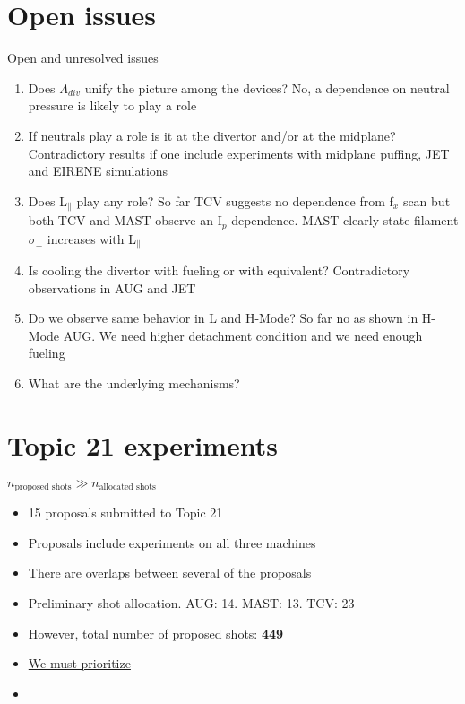 \documentclass[10pt, compress, draft]{beamer}
\begin{document}
  \section{Open issues}
  \begin{frame}{Open and unresolved issues}
  \begin{enumerate}[<+(1) | invisible@-+>]
    \item Does $\Lambda_{div}$ unify the picture among the devices?
      \alert{No, a dependence on neutral pressure is likely to play a role}
    \item If neutrals play a role is it at the divertor and/or at the midplane?
      \alert{Contradictory results if one include experiments with
        midplane puffing, JET and EIRENE simulations}
    \item Does L$_\parallel$ play any role? \alert{So far TCV suggests no
      dependence from f$_x$ scan but both TCV and MAST observe an
      I$_p$ dependence. MAST clearly state filament $\sigma_{\perp}$
      increases with L$_{\parallel}$ }
    \item Is cooling the divertor with fueling or with equivalent? \alert{Contradictory observations in AUG and JET}
    \item Do we observe same behavior in L and H-Mode? \alert{So
      far no as shown in H-Mode AUG. We need higher detachment
      condition and we need enough fueling}
      \item What are the underlying mechanisms? 
    \end{enumerate}
  \end{frame}
  
\section{Topic 21 experiments }
\begin{frame}{$n_{\text{proposed shots}} \gg n_{\text{allocated shots}}$}
	\begin{itemize}
		\item 15 proposals submitted to Topic 21
		\item Proposals include experiments on all three machines 
		\item There are overlaps between several of the proposals 
		\item Preliminary shot allocation. AUG: 14. MAST: 13. TCV: 23
		\item However, total number of proposed shots:  \textbf{449}
		\item \underline{We must prioritize}
		\item 

	\end{itemize}
\end{frame}
\end{document}

